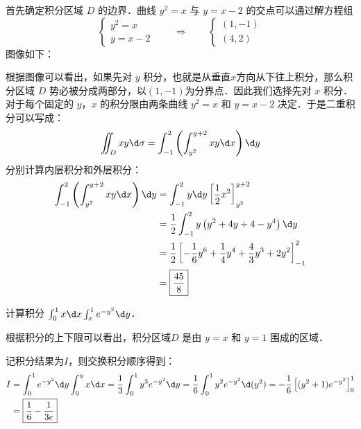 \documentclass[12pt, a4paper, oneside, UTF8]{ctexbook}
\begin{document}
\begin{solution}
首先确定积分区域 $D$ 的边界．曲线 $y^2 = x$ 与 $y = x - 2$ 的交点可以通过解方程组
\[\begin{cases}
y^2 = x \\
y = x - 2
\end{cases}\qquad\Rightarrow\qquad \begin{cases}
    (1,-1) \\
    (4,2)
\end{cases}\]
图像如下：
\begin{center}
\end{center}
根据图像可以看出，如果先对 $y$ 积分，也就是从垂直$x$方向从下往上积分，那么积分区域 $D$ 势必被分成两部分，以$(1,-1)$为分界点．因此我们选择先对 $x$ 积分．对于每个固定的 $y$，$x$ 的积分限由两条曲线 $y^2 = x$ 和 $y = x - 2$ 决定．于是二重积分可以写成：
\[\iint_D xy \d \sigma = \int_{-1}^{2} \left( \int_{y^2}^{y+2} xy \d x \right) \d y \]
分别计算内层积分和外层积分：
\begin{align*}
\int_{-1}^{2} \left( \int_{y^2}^{y+2} xy \d x \right) \d y &= 
\int_{-1}^{2} y\d y\left[\frac{1}{2}x^2\right]_{y^2}^{y+2} \\
&=\frac{1}{2} \int_{-1}^{2} y\left( y^2 + 4y + 4 - y^4 \right) \d y \\
&=\frac{1}{2} \left[ -\frac{1}{6}y^6 + \frac{1}{4}y^4 + \frac{4}{3}y^3 +2y^2 \right]_{-1}^{2} \\
&=\boxed{\frac{45}{8}}
\end{align*}
\end{solution}
\begin{example}
    计算积分 $\int_0^1 x \d x \int_x^1 e^{-y^2} \d y$．
\end{example}
\begin{solution}
根据积分的上下限可以看出，积分区域$D$ 是由 $y = x$ 和 $y = 1$ 围成的区域．
记积分结果为$I$，则交换积分顺序得到：
\begin{align*}
    I &= \int_0^1 e^{-y^2} \d y \int_0^y x \d x 
    = \frac{1}{3} \int_0^1 y^3 e^{-y^2} \d y 
    = \frac{1}{6} \int_0^1 y^2e^{-y^2} \d (y^2) 
    = -\frac{1}{6} \left[ (y^2 + 1)e^{-y^2} \right]_0^1 \\
    &= \boxed{\frac{1}{6} - \frac{1}{3e}}
\end{align*}
\end{solution}
\end{document}
